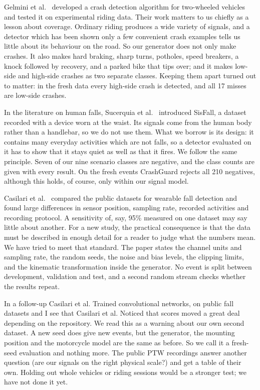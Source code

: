 \documentclass[10pt,a4paper]{article}
\begin{document}
Gelmini et al.~\cite{gelmini2021novel} developed a crash detection algorithm for two-wheeled vehicles and tested it on experimental riding data. Their work matters to us chiefly as a lesson about coverage. Ordinary riding produces a wide variety of signals, and a detector which has been shown only a few convenient crash examples tells us little about its behaviour on the road. So our generator does not only make crashes. It also makes hard braking, sharp turns, potholes, speed breakers, a knock followed by recovery, and a parked bike that tips over; and it makes low-side and high-side crashes as two separate classes. Keeping them apart turned out to matter: in the fresh data every high-side crash is detected, and all 17 misses are low-side crashes.

In the literature on human falls, Sucerquia et al.~\cite{sisfall} introduced SisFall, a dataset recorded with a device worn at the waist. Its signals come from the human body rather than a handlebar, so we do not use them. What we borrow is its design: it contains many everyday activities which are not falls, so a detector evaluated on it has to show that it stays quiet as well as that it fires. We follow the same principle. Seven of our nine scenario classes are negative, and the class counts are given with every result. On the fresh events CrashGuard rejects all 210 negatives, although this holds, of course, only within our signal model.

Casilari et al.~\cite{survey} compared the public datasets for wearable fall detection and found large differences in sensor position, sampling rate, recorded activities and recording protocol. A sensitivity of, say, 95\% measured on one dataset may say little about another. For a new study, the practical consequence is that the data must be described in enough detail for a reader to judge what the numbers mean. We have tried to meet that standard. The paper states the channel units and sampling rate, the random seeds, the noise and bias levels, the clipping limits, and the kinematic transformation inside the generator. No event is split between development, validation and test, and a second random stream checks whether the results repeat.

In a follow-up \cite{cnn} Casilari et al. Trained convolutional networks, on public fall datasets and I see that Casilari et al. Noticed that scores moved a great deal depending on the repository. We read this as a warning about our own second dataset. A new seed does give new events, but the generator, the mounting position and the motorcycle model are the same as before. So we call it a fresh-seed evaluation and nothing more. The public PTW recordings answer another question (are our signals on the right physical scale?) and get a table of their own. Holding out whole vehicles or riding sessions would be a stronger test; we have not done it yet.
\end{document}
